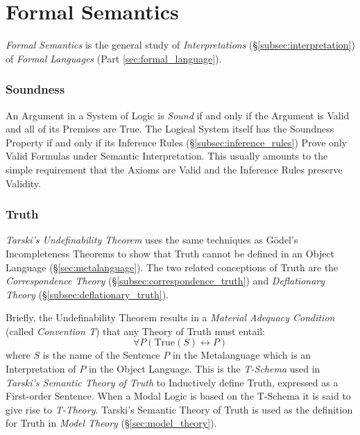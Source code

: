 \part{Formal Semantics}\label{sec:formal_semantics}

\emph{Formal Semantics} is the general study of \emph{Interpretations}
(\S\ref{subsec:interpretation}) of \emph{Formal Languages} (Part
\ref{sec:formal_language}).



\section{Soundness}\label{sec:soundness}

An Argument in a System of Logic is \emph{Sound} if and only if the
Argument is Valid and all of its Premises are True. The Logical System
itself has the Soundness Property if and only if its Inference Rules
(\S\ref{subsec:inference_rules}) Prove only Valid Formulas under
Semantic Interpretation. This usually amounts to the simple
requirement that the Axioms are Valid and the Inference Rules preserve
Validity.



\section{Truth}\label{sec:semantic_truth}

\emph{Tarski's Undefinability Theorem} \cite{tarski36} uses the same
techniques as G\"odel's Incompleteness Theorems to show that Truth
cannot be defined in an Object Language
(\S\ref{sec:metalanguage}). The two related conceptions of Truth are
the \emph{Correspondence Theory} (\S\ref{subsec:correspondence_truth})
and \emph{Deflationary Theory} (\S\ref{subsec:deflationary_truth}).

Briefly, the Undefinability Theorem results in a \emph{Material
  Adequacy Condition} (called \emph{Convention T}) that any Theory of
Truth must entail:
\[
    \forall P (\mathrm{True}(S) \leftrightarrow P)
\]
where $S$ is the name of the Sentence $P$ in the Metalanguage which is
an Interpretation of $P$ in the Object Language. This is the
\emph{T-Schema} used in \emph{Tarski's Semantic Theory of Truth} to
Inductively define Truth, expressed as a First-order Sentence. When a
Modal Logic is based on the T-Schema it is said to give rise to
\emph{T-Theory}. Tarski's Semantic Theory of Truth is used as the
definition for Truth in \emph{Model Theory}
(\S\ref{sec:model_theory}).

